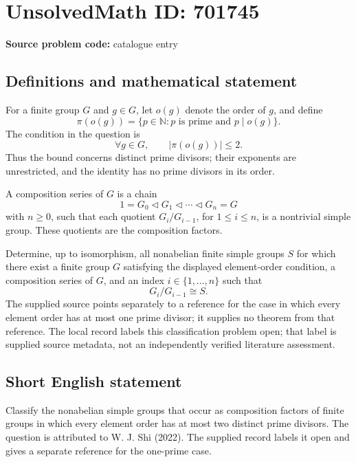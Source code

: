 \documentclass[11pt]{article}
\newcommand{\N}{\mathbb{N}}
\begin{document}
\section*{UnsolvedMath ID: 701745}
\textbf{Source problem code:} catalogue entry
\subsection{Definitions and mathematical statement}
For a finite group \(G\) and \(g\in G\), let \(o(g)\) denote the order of \(g\), and define
\[
\pi(o(g))=\{p\in\N : p\text{ is prime and }p\mid o(g)\}.
\]
The condition in the question is
\[
\forall g\in G,\qquad |\pi(o(g))|\leq 2.
\]
Thus the bound concerns distinct prime divisors; their exponents are unrestricted, and the identity has no prime divisors in its order.

A composition series of \(G\) is a chain
\[
1=G_0\triangleleft G_1\triangleleft\cdots\triangleleft G_n=G
\]
with \(n\geq 0\), such that each quotient \(G_i/G_{i-1}\), for \(1\leq i\leq n\), is a nontrivial simple group. These quotients are the composition factors.

Determine, up to isomorphism, all nonabelian finite simple groups \(S\) for which there exist a finite group \(G\) satisfying the displayed element-order condition, a composition series of \(G\), and an index \(i\in\{1,\ldots,n\}\) such that
\[
G_i/G_{i-1}\cong S.
\]
The supplied source points separately to a reference for the case in which every element order has at most one prime divisor; it supplies no theorem from that reference. The local record labels this classification problem open; that label is supplied source metadata, not an independently verified literature assessment.
\subsection{Short English statement}
Classify the nonabelian simple groups that occur as composition factors of finite groups in which every element order has at most two distinct prime divisors. The question is attributed to W. J. Shi (2022). The supplied record labels it open and gives a separate reference for the one-prime case.
\end{document}
